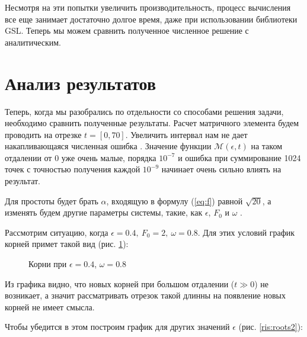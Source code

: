 \documentclass[%
bachelor,    %
natbib,      %
subf,        %
href,        %
colorlinks,  %
]{disser}
\newcommand{\sectionbreak}{\clearpage}
\newcommand{\cM}{\mathcal{M}}
\begin{document}
Несмотря на эти попытки увеличить производительность, процесс вычисления все еще занимает достаточно долгое время, даже при использовании библиотеки GSL.
Теперь мы можем сравнить полученное численное решение с аналитическим.

\sectionbreak
\section{Анализ результатов}
Теперь, когда мы разобрались по отдельности со способами решения задачи, необходимо сравнить полученные результаты.
Расчет матричного элемента будем проводить на отрезке $t = [0, 70]$. Увеличить интервал нам не дает накапливающаяся численная ошибка . Значение функции $\cM(\epsilon, t)$ на таком отдалении от 0 уже очень малые, порядка $10^{-7}$ и ошибка при суммирование 1024 точек с точностью получения каждой $10^{-9}$ начинает очень сильно влиять на результат.

Для простоты будет брать $\alpha$, входящую в формулу (\ref{eq:f}) равной $\sqrt{20}$, а изменять будем другие параметры системы, такие, как $\epsilon$, $F_0$ и $\omega$ .

Рассмотрим ситуацию, когда $\epsilon = 0.4,\ F_0 = 2,\ \omega = 0.8$. Для этих условий график корней примет такой вид (рис. \ref{ris:roots1}):

\begin{figure}[h]
	\caption{Корни при $\epsilon = 0.4$, $\omega = 0.8$}
	\label{ris:roots1}
\end{figure}

Из графика видно, что новых корней при большом отдалении ($t\gg0$) не возникает, а значит рассматривать отрезок такой длинны на появление новых корней не имеет смысла.

Чтобы убедится в этом построим график для других значений $\epsilon$ (рис. \ref{ris:roots2}):
\end{document}
